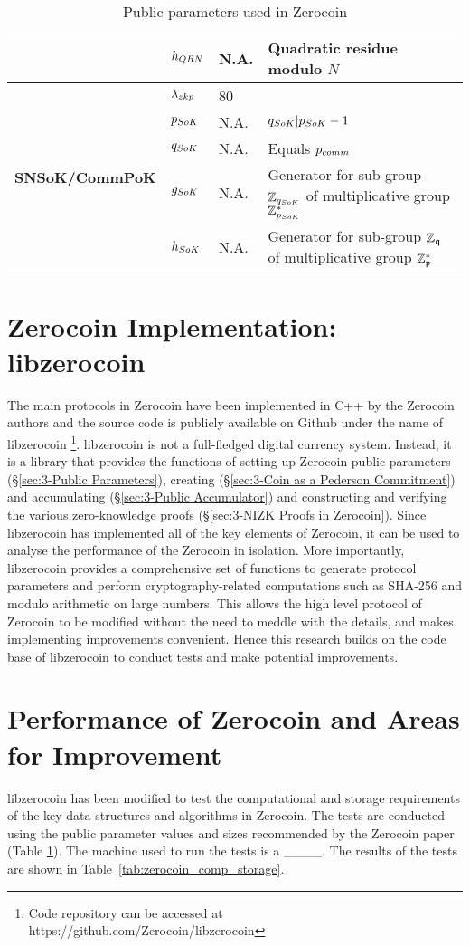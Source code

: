\begin{table}[H]
\begin{tabular}{ l | m{2cm} | m{2.5cm} | m{5.5cm} }
		& $h_{QRN}$ & N.A. & Quadratic residue modulo $N$ \\
		\hline
		\multirow{5}{*}{\textbf{SNSoK/CommPoK}}
		& $\lambda_{zkp}$ & 80 & \\
		& $p_{SoK}$ & N.A. & $q_{SoK}|p_{SoK}-1$\\
		& $q_{SoK}$ & N.A. & Equals $p_{comm}$ \\
		& $g_{SoK}$ & N.A. & Generator for sub-group $\mathbb{Z}_{q_{SoK}}$ of multiplicative group $\mathbb{Z}_{p_{SoK}}^{*}$\\
		& $h_{SoK}$ & N.A. & Generator for sub-group $\mathbb{Z}_{\mathfrak{q}}$ of multiplicative group $\mathbb{Z}_{\mathfrak{p}}^{*}$\\
		\hline
	\end{tabular}
	\caption{Public parameters used in Zerocoin}
	\label{tab:pub_params}
\end{table}

\section{Zerocoin Implementation: libzerocoin}
\label{sec:3-Zerocoin Implementation: libzerocoin}
The main protocols in Zerocoin have been implemented in C++ by the Zerocoin authors and the source code is publicly available on Github under the name of libzerocoin \footnote{Code repository can be accessed at https://github.com/Zerocoin/libzerocoin}. libzerocoin is not a full-fledged digital currency system. Instead, it is a library that provides the functions of setting up Zerocoin public parameters (\S\ref{sec:3-Public Parameters}), creating (\S\ref{sec:3-Coin as a Pederson Commitment}) and accumulating  (\S\ref{sec:3-Public Accumulator}) and constructing and verifying the various zero-knowledge proofs (\S\ref{sec:3-NIZK Proofs in Zerocoin}). Since libzerocoin has implemented all of the key elements of Zerocoin, it can be used to analyse the performance of the Zerocoin in isolation. More importantly, libzerocoin provides a comprehensive set of functions to generate protocol parameters and perform cryptography-related computations such as SHA-256 and modulo arithmetic on large numbers. This allows the high level protocol of Zerocoin to be modified without the need to meddle with the details, and makes implementing improvements convenient. Hence this research builds on the code base of libzerocoin to conduct tests and make potential improvements.
 
\section{Performance of Zerocoin and Areas for Improvement}
\label{sec:3-Performance of Zerocoin and Areas for Improvement}
libzerocoin has been modified to test the computational and storage requirements of the key data structures and algorithms in Zerocoin. The tests are conducted using the public parameter values and sizes recommended by the Zerocoin paper (Table \ref{tab:pub_params}). The machine used to run the tests is a \_\_\_\_. The results of the tests are shown in Table~\ref{tab:zerocoin_comp_storage}.

